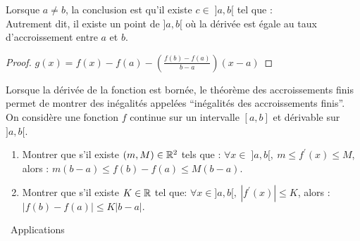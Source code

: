 \documentclass[a4paper, 11pt]{article}
\begin{document}
\begin{rem}
	Lorsque $a \not= b$, la conclusion est qu'il existe $c \in \; ]a,b[$ tel que : \dotfill\vsec\\
	Autrement dit, il existe un point de $]a,b[$ o\`u la d\'eriv\'ee est \'egale au taux d'accroissement entre $a$ et $b$.
\end{rem}

\begin{proof}
	$g(x) = f(x) - f(a) - \left(\frac{f(b)-f(a)}{b-a} \right) (x-a)$
\end{proof}

%
%
%

{\footnotesize
\begin{exercice} Lorsque la d\'eriv\'ee de la fonction est born\'ee, le th\'eor\`eme des accroissements finis permet de montrer des in\'egalit\'es appel\'ees ``in\'egalit\'es des accroissements finis''. On consid\`ere une fonction $f$ continue sur un intervalle $[a,b]$ et d\'erivable sur $]a,b[$.
	\begin{enumerate}
		\item Montrer que s'il existe $(m,M)\in\mathbb{R}^2$ tels que : $\forall x\in \; \rbrack a,b\lbrack,\ m\leq f^{\prime}(x)\leq M$, alors : \; $m(b-a)\leq f(b)-f(a)\leq M(b-a).$
		\item Montrer que s'il existe $K\in\mathbb{R}$ tel que: $\forall x\in\rbrack a,b\lbrack,\  \left| f^{\prime}(x)\right| \leq K$,
		      alors : \; $\left| f(b)-f(a) \right| \leq K |b-a|.$
	\end{enumerate}
\end{exercice}}
\vsec\vsec

\noindent\ {Applications}
\end{document}
